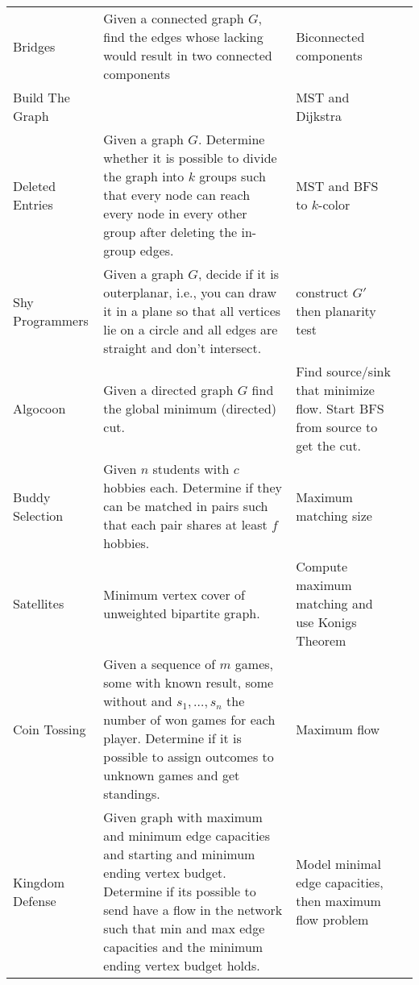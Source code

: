 \documentclass[a4paper, 10pt]{article}
\begin{document}
\begin{longtable}{ L{2cm} L{8cm} L{4cm} r}
        Bridges 
        & Given a connected graph $G$, find the edges whose lacking would result in two connected components         
        & Biconnected components &  \pageref{sec:bridges} \\

        Build The Graph 
        &          
        & MST and Dijkstra &  \pageref{sec:build_the_graph} \\

        Deleted Entries 
        & Given a graph $G$. Determine whether it is possible to divide the graph into $k$ groups such that every node can reach every node in every other group
            after deleting the in-group edges.
        & MST and BFS to $k$-color &  \pageref{sec:deleted_entries} \\

        Shy Programmers 
        & Given a graph $G$, decide if it is outerplanar, i.e., you can draw it in a plane so that all vertices lie on a 
            circle and all edges are straight and don't intersect.
        & construct $G'$ then planarity test &  \pageref{sec:shy_programmers} \\

        Algocoon 
        & Given a directed graph $G$ find the global minimum (directed) cut.
        & Find source/sink that minimize flow. Start BFS from source to get the cut. &  \pageref{sec:algocoon} \\

        Buddy Selection
        & Given $n$ students with $c$ hobbies each. Determine if they can be matched in pairs such that each pair shares at least $f$ hobbies.
        & Maximum matching size &  \pageref{sec:buddy_selection} \\

        Satellites 
        & Minimum vertex cover of unweighted bipartite graph. 
        & Compute maximum matching and use Konigs Theorem &  \pageref{sec:satellites} \\

        Coin Tossing
        & Given a sequence of $m$ games, some with known result, some without and $s_1,\dots,s_n$ the number of won games for each player.
            Determine if it is possible to assign outcomes to unknown games and get standings.
        & Maximum flow &  \pageref{sec:coin_tossing} \\

        Kingdom Defense 
        & Given graph with maximum and minimum edge capacities and starting and minimum ending vertex budget.
            Determine if its possible to send have a flow in the network such that min and max edge capacities and the minimum ending vertex budget holds.            
        & Model minimal edge capacities, then maximum flow problem &  \pageref{sec:kingdom_defense} \\


\end{longtable}
\end{document}
